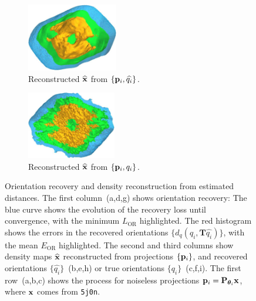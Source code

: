 \begin{figure}[t]
\begin{subfigure}[b]{0.26\linewidth}
        \includegraphics[height=8em]{figures/5a1a_aligned}
        \caption{Reconstructed $\widehat{\mathbf{x}}$ from $\{ \mathbf{p}_i, \widehat{q_i} \}$.}%
        \label{fig:5a1a-noise0-reconstruction-recovered}
    \end{subfigure}
    \hfill
    \begin{subfigure}[b]{0.26\linewidth}
        \centering
        \includegraphics[height=8em]{figures/5a1a_ground_truth}
        \caption{Reconstructed $\widehat{\mathbf{x}}$ from $\{ \mathbf{p}_i, q_i \}$.}%
        \label{fig:5a1a-noise0-reconstruction-true}
    \end{subfigure}
    \caption{%
        Orientation recovery and density reconstruction from estimated distances.
        The first column~(a,d,g) shows orientation recovery:
        The blue curve shows the evolution of the recovery loss until convergence, with the minimum $L_\text{OR}$  highlighted.
        The red histogram shows the errors in the recovered orientations $\{d_q(q_i, \mathbf{T}\widehat{q_i})\}$, with the mean $E_\text{OR}$  highlighted.
    The second and third columns show density maps $\widehat{\mathbf{x}}$ reconstructed from projections $\{ \mathbf{p}_i \}$, and recovered orientations $\{ \widehat{q_i} \}$~(b,e,h) or true orientations $\{ q_i \}$~(c,f,i).
        The first row~(a,b,c) shows the process for noiseless projections $\mathbf{p}_i = \mathbf{P}_{{\boldsymbol{\theta}}_i} \mathbf{x}$, where $\mathbf{x}$ comes from \texttt{5j0n}.
}
\end{figure}
